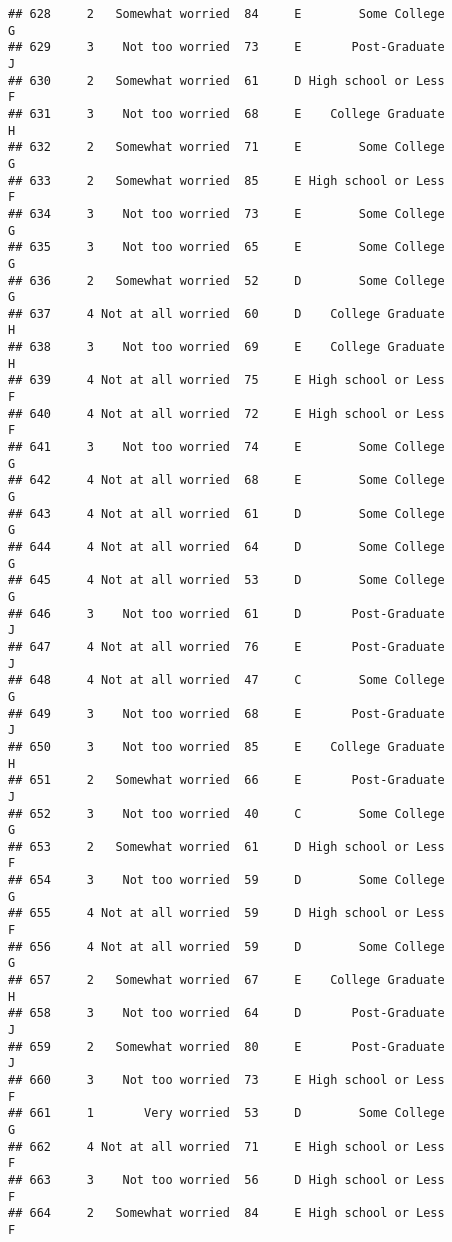 \documentclass[
]{article}
\begin{document}
\begin{verbatim}
## 628     2   Somewhat worried  84     E        Some College         G
## 629     3    Not too worried  73     E       Post-Graduate         J
## 630     2   Somewhat worried  61     D High school or Less         F
## 631     3    Not too worried  68     E    College Graduate         H
## 632     2   Somewhat worried  71     E        Some College         G
## 633     2   Somewhat worried  85     E High school or Less         F
## 634     3    Not too worried  73     E        Some College         G
## 635     3    Not too worried  65     E        Some College         G
## 636     2   Somewhat worried  52     D        Some College         G
## 637     4 Not at all worried  60     D    College Graduate         H
## 638     3    Not too worried  69     E    College Graduate         H
## 639     4 Not at all worried  75     E High school or Less         F
## 640     4 Not at all worried  72     E High school or Less         F
## 641     3    Not too worried  74     E        Some College         G
## 642     4 Not at all worried  68     E        Some College         G
## 643     4 Not at all worried  61     D        Some College         G
## 644     4 Not at all worried  64     D        Some College         G
## 645     4 Not at all worried  53     D        Some College         G
## 646     3    Not too worried  61     D       Post-Graduate         J
## 647     4 Not at all worried  76     E       Post-Graduate         J
## 648     4 Not at all worried  47     C        Some College         G
## 649     3    Not too worried  68     E       Post-Graduate         J
## 650     3    Not too worried  85     E    College Graduate         H
## 651     2   Somewhat worried  66     E       Post-Graduate         J
## 652     3    Not too worried  40     C        Some College         G
## 653     2   Somewhat worried  61     D High school or Less         F
## 654     3    Not too worried  59     D        Some College         G
## 655     4 Not at all worried  59     D High school or Less         F
## 656     4 Not at all worried  59     D        Some College         G
## 657     2   Somewhat worried  67     E    College Graduate         H
## 658     3    Not too worried  64     D       Post-Graduate         J
## 659     2   Somewhat worried  80     E       Post-Graduate         J
## 660     3    Not too worried  73     E High school or Less         F
## 661     1       Very worried  53     D        Some College         G
## 662     4 Not at all worried  71     E High school or Less         F
## 663     3    Not too worried  56     D High school or Less         F
## 664     2   Somewhat worried  84     E High school or Less         F

\end{verbatim}
\end{document}
